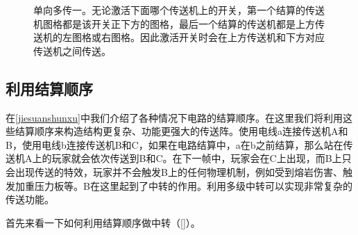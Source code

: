 \begin{figure}[!h]
\begin{center}
\qquad
{}
\end{center}
\caption{单向多传一。无论激活下面哪个传送机上的开关，第一个结算的传送机图格都是该开关正下方的图格，最后一个结算的传送机都是上方传送机的左图格或右图格。因此激活开关时会在上方传送机和下方对应传送机之间传送。}
\label{i247:248}
\end{figure}

\subsection{利用结算顺序}
在\autoref{jiesuanshunxu}中我们介绍了各种情况下电路的结算顺序。在这里我们将利用这些结算顺序来构造结构更复杂、功能更强大的传送阵。使用电线a连接传送机A和B，使用电线b连接传送机B和C，如果在电路结算中，a在b之前结算，那么站在传送机A上的玩家就会依次传送到B和C。在下一帧中，玩家会在C上出现，而B上只会出现传送的特效，玩家并不会触发B上的任何物理机制，例如受到熔岩伤害、触发加重压力板等。B在这里起到了中转的作用。利用多级中转可以实现非常复杂的传送功能。

首先来看一下如何利用结算顺序做中转（\autoref{}）。

